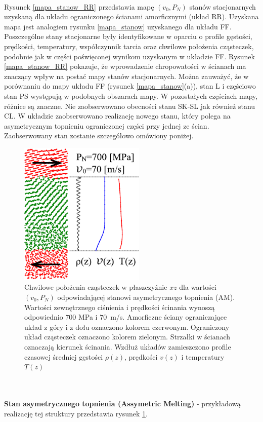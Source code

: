 \documentclass[12pt,a4paper,openright]{report} %
\begin{document}
\\
Rysunek \ref{mapa_stanow_RR} przedstawia mapę $(v_0, P_N)$ stanów stacjonarnych uzyskaną dla układu ograniczonego ścianami amorficznymi (układ RR). 
%
%
\noindent
Uzyskana mapa jest analogiem rysunku \ref{mapa_stanow} uzyskanego dla układu FF. Poszczególne stany stacjonarne były identyfikowane w oparciu o profile gęstości, prędkości, temperatury, współczynnik tarcia oraz chwilowe położenia cząsteczek, podobnie jak w części poświęconej wynikom uzyskanym w układzie FF. Rysunek \ref{mapa_stanow_RR} pokazuje, że wprowadzenie chropowatości w ścianach ma znaczący wpływ na postać mapy stanów stacjonarnych. Można zauważyć, że w porównaniu do mapy układu FF (rysunek \ref{mapa_stanow}(a)), stan L i częściowo stan PS występują w podobnych obszarach mapy. W pozostałych częściach mapy, różnice są znaczne. Nie zaobserwowano obecności stanu SK-SL jak również stanu CL. W układzie zaobserwowano realizację nowego stanu, który polega na asymetrycznym topnieniu ograniczonej części przy jednej ze ścian. Zaobserwowany stan zostanie szczegółowo omówiony poniżej.
%
%
\begin{figure}[h]
\centering
\includegraphics[width=60mm]{rysunki/PRE16_fig15.pdf}
\caption{Chwilowe położenia cząsteczek w płaszczyźnie $xz$ dla wartości $(v_0, P_N)$ odpowiadającej stanowi asymetrycznego topnienia (AM). Wartości zewnętrznego ciśnienia i prędkości ścinania wynoszą odpowiednio $700$ MPa i $70$~m/s. Amorficzne ściany ograniczające układ z góry i z dołu oznaczono kolorem czerwonym. Ograniczony układ cząsteczek oznaczono kolorem zielonym. Strzałki w ścianach oznaczają kierunek ścinania. Wzdłuż układów zamieszczono profile czasowej średniej gęstości $\rho(z)$, prędkości $v(z)$ i temperatury $T(z)$}
\label{AM}
\end{figure}
\noindent
\\
\\
\textbf{Stan asymetrycznego topnienia (Assymetric Melting)} - przykładową realizację tej struktury przedstawia rysunek \ref{AM}. 
\end{document}
